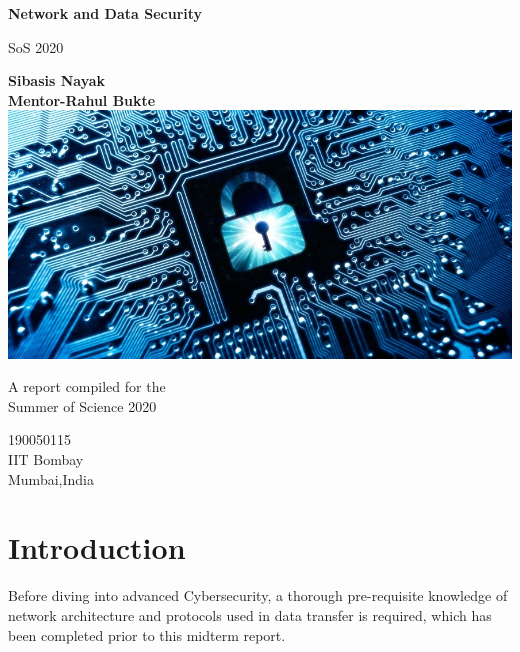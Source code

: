 \documentclass{article}
\begin{document}
\begin{titlepage}
   \begin{center}
       \vspace*{1cm}

       \textbf{\Huge Network and Data Security}

       \vspace{0.5cm}
       {\Large SoS 2020}
            
       \vspace{1.5cm}

       \textbf{Sibasis Nayak\\Mentor-Rahul Bukte\\}
        \vfill
       \includegraphics[scale = 0.5]{img.jpg}
        
        
        \vfill
        
       A report compiled for the \\
       Summer of Science 2020
            
       \vspace{0.8cm}
     
       
            
       190050115\\
       IIT Bombay\\
       Mumbai,India\\
            
   \end{center}
\end{titlepage}

\section{Introduction}
Before diving into advanced Cybersecurity, a thorough pre-requisite knowledge of network architecture and protocols used in data transfer is required, which has been completed prior to this midterm report.
\end{document}
